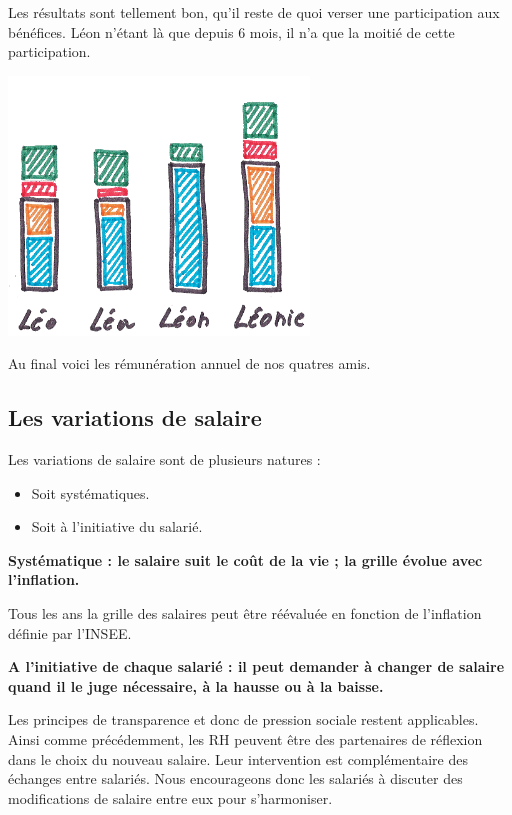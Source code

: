\documentclass[12pt]{article}
\newcommand{\regle}[1]{%
  \begin{tcolorbox}[colframe=DarkOrange,boxrule=2pt,arc=4pt,left=6pt,right=6pt,top=6pt,bottom=6pt,boxsep=0pt,colback=LightOrange]
  \textbf{#1}
  \end{tcolorbox}
}
\begin{document}
 Les résultats sont tellement bon, qu’il reste de quoi verser une participation aux bénéfices. Léon n’étant là que depuis 6 mois, il n’a que la moitié de cette participation.

 \begin{center}
 \includegraphics[width=0.6\textwidth]{includes/remuneration}
 \end{center}
 Au final voici les rémunération annuel de nos quatres amis.

\subsection{Les variations de salaire}
 Les variations de salaire sont de plusieurs natures : 
 \begin{itemize}
   \item Soit systématiques.
   \item Soit à l’initiative du salarié.
 \end{itemize}

 \vspace{3mm}
 \regle{Systématique : le salaire suit le coût de la vie ; la grille évolue avec l’inflation.}

 Tous les ans la grille des salaires peut être réévaluée en fonction de l’inflation définie par l’INSEE.

 \regle{A l'initiative de chaque salarié : il peut demander à changer de salaire quand il le juge nécessaire, à la hausse ou à la baisse.}

 Les principes de transparence et donc de pression sociale restent applicables. Ainsi comme précédemment, les RH peuvent être des partenaires de réflexion dans le choix du nouveau salaire. Leur intervention est complémentaire des échanges entre salariés. Nous encourageons donc les salariés à discuter des modifications de salaire entre eux pour s’harmoniser. 
\end{document}
